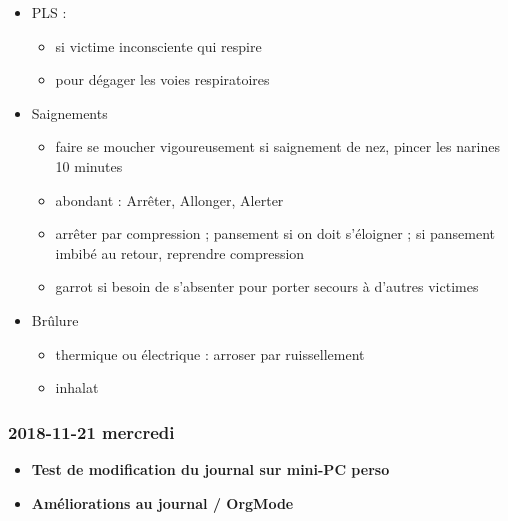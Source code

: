 \documentclass[a4paper]{article}
\begin{document}
\begin{itemize}
\begin{itemize}
\item PLS :
\begin{itemize}
\item si victime inconsciente qui respire
\item pour dégager les voies respiratoires
\end{itemize}

\item Saignements
\begin{itemize}
\item faire se moucher vigoureusement si saignement de nez, pincer les narines 10 minutes
\item abondant : Arrêter, Allonger, Alerter
\item arrêter par compression ; pansement si on doit s'éloigner ; si pansement imbibé au retour, reprendre compression
\item garrot si besoin de s'absenter pour porter secours à d'autres victimes
\end{itemize}

\item Brûlure
\begin{itemize}
\item thermique ou électrique : arroser par ruissellement
\item inhalat
\end{itemize}
\end{itemize}
\end{itemize}
\subsubsection*{2018-11-21 mercredi}
\label{sec:org4e7bfaa}
\begin{itemize}
\item \textbf{Test de modification du journal sur mini-PC perso}
\label{sec:orgeafc878}

\item \textbf{Améliorations au journal / OrgMode}
\label{sec:orgce505a8}
\end{itemize}
\end{document}
